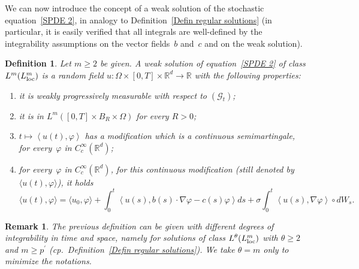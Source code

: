 \documentclass[a4paper,10pt]{article}
\newtheorem{definition}[theorem]{Definition}
\newtheorem{remark}[theorem]{Remark}
\newcommand\1{\mathbbm{1}}
\newcommand{\lan}{\langle}
\newcommand{\ran}{\rangle}
\newcommand\loc{{\rm loc}}
\numberwithin{equation}{section}
\begin{document}
We can now introduce the concept of a weak solution of the stochastic equation~\eqref{SPDE 2}, in analogy to Definition~\ref{Defin regular solutions} (in particular, it is easily verified that all integrals are well-defined by the integrability assumptions on the vector fields~$b$ and~$c$ and on the weak solution). 

\begin{definition}
\label{Def weak sol SPDE}
Let $m\geq2$ be given. A \emph{weak solution of equation~\eqref{SPDE 2} of class $L^{m}(L^{m}_\loc)$} is a random field $u \colon \Omega\times [0,T]
\times\mathbb{R}^{d}\rightarrow\mathbb{R}$ with the following properties:\begin{enumerate}[font=\normalfont, label=(\roman{*}), ref=(\roman{*})]
  \item[(o)] it is weakly progressively measurable with respect to $(\mathcal{G}_{t})$;
  \item it is in $L^{m}([0,T] \times B_{R}\times \Omega)$ for every $R>0$;
  \item $t\mapsto\left\langle u(t)  ,\varphi\right\rangle $ has a modification which 
  is a continuous semimartingale, for every~$\varphi$ in $C_{c}^{\infty}(\mathbb{R}^{d})$;
  \item for every~$\varphi$ in $C_{c}^{\infty}(\mathbb{R}^{d})$, for this continuous modification \textup{(}still denoted by $\lan u(t),\varphi\ran$\textup{)}, it holds
\[\label{formulation_SPDE2}
\langle u(t)  ,\varphi\rangle=\langle u_{0},\varphi\rangle 
+\int_{0}^{t}\left\langle u(s)  ,b(s)  \cdot
\nabla\varphi-c(s)  \varphi\right\rangle ds + \sigma \int_{0}^{t}\left\langle u(s)  ,\nabla\varphi\right\rangle \circ dW_{s} .
\]
\end{enumerate}
\end{definition}

\begin{remark}
The previous definition can be given with different degrees of integrability in time and space, namely for solutions of class $L^{\theta}(L_{\loc}^{m})$ with $\theta\geq2$ and $m\geq p^{\prime}$ \textup{(}cp.~Definition~\ref{Defin regular solutions}\textup{)}. We take $\theta=m$ only to minimize the notations.
\end{remark}
\end{document}

